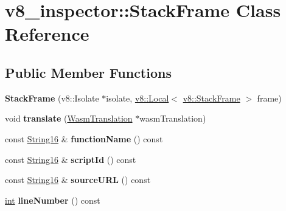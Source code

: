 \hypertarget{classv8__inspector_1_1StackFrame}{}\section{v8\+\_\+inspector\+:\+:Stack\+Frame Class Reference}
\label{classv8__inspector_1_1StackFrame}
\subsection*{Public Member Functions}
\begin{DoxyCompactItemize}
\item 
\mbox{\label{classv8__inspector_1_1StackFrame_ac45a091ad103345e42dc3f90bb7064b2}} 
{\bfseries Stack\+Frame} (v8\+::\+Isolate $\ast$isolate, \mbox{\hyperlink{classv8_1_1Local}{v8\+::\+Local}}$<$ \mbox{\hyperlink{classv8_1_1StackFrame}{v8\+::\+Stack\+Frame}} $>$ frame)
\item 
\mbox{\label{classv8__inspector_1_1StackFrame_aecd12add263745a73b45d1afb0bc8535}} 
void {\bfseries translate} (\mbox{\hyperlink{classv8__inspector_1_1WasmTranslation}{Wasm\+Translation}} $\ast$wasm\+Translation)
\item 
\mbox{\label{classv8__inspector_1_1StackFrame_ac963580a1cc89c1415b2d54c0c636da0}} 
const \mbox{\hyperlink{classv8__inspector_1_1String16}{String16}} \& {\bfseries function\+Name} () const
\item 
\mbox{\label{classv8__inspector_1_1StackFrame_a5e4a58f463991d46622456d1254c1ade}} 
const \mbox{\hyperlink{classv8__inspector_1_1String16}{String16}} \& {\bfseries script\+Id} () const
\item 
\mbox{\label{classv8__inspector_1_1StackFrame_af0935693c9984ff2d8098c0096d0fb5c}} 
const \mbox{\hyperlink{classv8__inspector_1_1String16}{String16}} \& {\bfseries source\+U\+RL} () const
\item 
\mbox{\label{classv8__inspector_1_1StackFrame_a27eb1b6bee71f5d1452213365be06282}} 
\mbox{\hyperlink{classint}{int}} {\bfseries line\+Number} () const

\end{DoxyCompactItemize}
